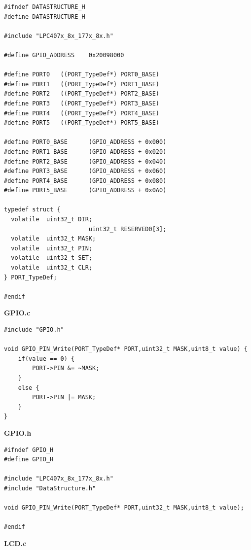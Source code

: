 \documentclass{article}
\begin{document}
\begin{lstlisting}
#ifndef DATASTRUCTURE_H
#define DATASTRUCTURE_H

#include "LPC407x_8x_177x_8x.h"

#define GPIO_ADDRESS	0x20098000

#define PORT0	((PORT_TypeDef*) PORT0_BASE)
#define PORT1	((PORT_TypeDef*) PORT1_BASE)
#define PORT2	((PORT_TypeDef*) PORT2_BASE)
#define PORT3	((PORT_TypeDef*) PORT3_BASE)
#define PORT4	((PORT_TypeDef*) PORT4_BASE)
#define PORT5	((PORT_TypeDef*) PORT5_BASE)

#define PORT0_BASE		(GPIO_ADDRESS + 0x000)
#define PORT1_BASE		(GPIO_ADDRESS + 0x020)
#define PORT2_BASE		(GPIO_ADDRESS + 0x040)
#define PORT3_BASE		(GPIO_ADDRESS + 0x060)
#define PORT4_BASE		(GPIO_ADDRESS + 0x080)
#define PORT5_BASE		(GPIO_ADDRESS + 0x0A0)

typedef struct {
  volatile	uint32_t DIR;
						uint32_t RESERVED0[3];
  volatile	uint32_t MASK;
  volatile	uint32_t PIN;
  volatile	uint32_t SET;
  volatile  uint32_t CLR;
} PORT_TypeDef;

#endif
\end{lstlisting}
\linebreak
\textbf{GPIO.c}
\begin{lstlisting}
#include "GPIO.h"

void GPIO_PIN_Write(PORT_TypeDef* PORT,uint32_t MASK,uint8_t value) {
	if(value == 0) {
		PORT->PIN &= ~MASK;
	}
	else {
		PORT->PIN |= MASK;
	}
}
\end{lstlisting}
\linebreak
\textbf{GPIO.h}
\begin{lstlisting}
#ifndef GPIO_H
#define GPIO_H

#include "LPC407x_8x_177x_8x.h"
#include "DataStructure.h"

void GPIO_PIN_Write(PORT_TypeDef* PORT,uint32_t MASK,uint8_t value);

#endif
\end{lstlisting}
\linebreak
\textbf{LCD.c}
\end{document}
